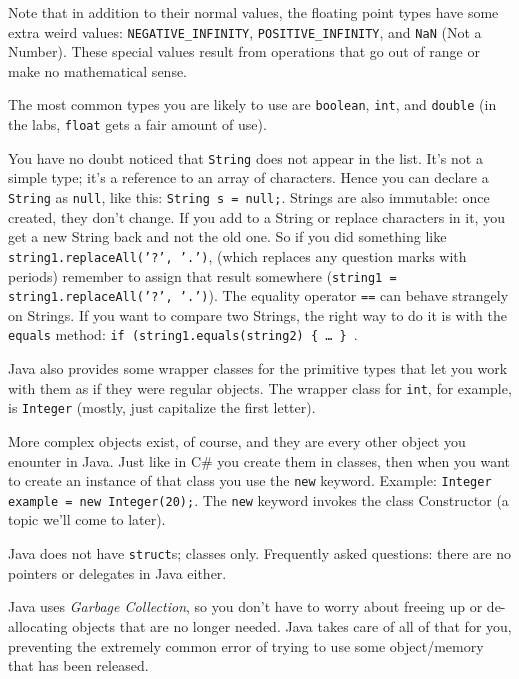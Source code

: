 Note that in addition to their normal values, the floating point types have some extra weird values: \texttt{NEGATIVE\_INFINITY}, \texttt{POSITIVE\_INFINITY}, and \texttt{NaN} (Not a Number). These special values result from operations that go out of range or make no mathematical sense. 

The most common types you are likely to use are \texttt{boolean}, \texttt{int}, and \texttt{double} (in the labs, \texttt{float} gets a fair amount of use).

You have no doubt noticed that \texttt{String} does not appear in the list. It's not a simple type; it's a reference to an array of characters. Hence you can declare a \texttt{String} as \texttt{null}, like this: \texttt{String s = null;}. Strings are also immutable: once created, they don't change. If you add to a String or replace characters in it, you get a new String back and not the old one. So if you did something like \texttt{string1.replaceAll('?', '.')}, (which replaces any question marks with periods) remember to assign that result somewhere (\texttt{string1 = string1.replaceAll('?', '.')}). The equality operator \texttt{==} can behave strangely on Strings. If you want to compare two Strings, the right way to do it is with the \texttt{equals} method: \texttt{if (string1.equals(string2) \{ \ldots~\} }.

Java also provides some wrapper classes for the primitive types that let you work with them as if they were regular objects. The wrapper class for \texttt{int}, for example, is \texttt{Integer} (mostly, just capitalize the first letter). 

More complex objects exist, of course, and they are every other object you enounter in Java. Just like in C\# you create them in classes, then when you want to create an instance of that class you use the \texttt{new} keyword. Example: \texttt{Integer example = new Integer(20);}. The \texttt{new} keyword invokes the class Constructor (a topic we'll come to later).

Java does not have \texttt{struct}s; classes only. Frequently asked questions: there are no pointers or delegates in Java either.

Java uses \textit{Garbage Collection}, so you don't have to worry about freeing up or de-allocating objects that are no longer needed. Java takes care of all of that for you, preventing the extremely common error of trying to use some object/memory that has been released.

